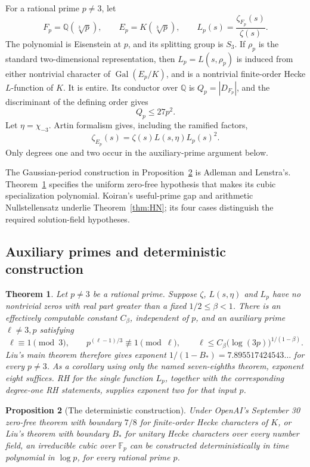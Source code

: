 \documentclass[11pt]{article}
\newtheorem{theorem}{Theorem}[section]
\newtheorem{proposition}[theorem]{Proposition}
\newcommand{\Q}{\mathbb Q}
\newcommand{\F}{\mathbb F}
\begin{document}
For a rational prime $p\ne3$, let
\[
 F_p=\Q(\sqrt[3]p),\qquad E_p=K(\sqrt[3]p),\qquad
 L_p(s)=\frac{\zeta_{F_p}(s)}{\zeta(s)}.
\]
The polynomial is Eisenstein at $p$, and its splitting group is $S_3$.
If $\rho_p$ is the standard two-dimensional representation, then
$L_p=L(s,\rho_p)$ is induced from either nontrivial character of
$\operatorname{Gal}(E_p/K)$, and is a nontrivial finite-order Hecke
$L$-function of $K$. It is entire. Its conductor over $\Q$ is
$Q_p=|D_{F_p}|$, and the discriminant of the defining order gives
\[
 Q_p\le27p^2.                                                     \tag{1.1}
\]
Let $\eta=\chi_{-3}$. Artin formalism gives, including the ramified factors,
\[
 \zeta_{E_p}(s)=\zeta(s)L(s,\eta)L_p(s)^2.                          \tag{1.2}
\]
Only degrees one and two occur in the auxiliary-prime argument below.

The Gaussian-period construction in Proposition~\ref{prop:algorithm}
is Adleman and Lenstra's. Theorem~\ref{thm:aux} specifies the uniform
zero-free hypothesis that makes its cubic specialization polynomial.
Koiran's useful-prime gap and arithmetic Nullstellensatz underlie
Theorem~\ref{thm:HN}; its four cases distinguish the required
solution-field hypotheses.


\subsection*{Auxiliary primes and deterministic construction}
\begin{theorem}\label{thm:aux}
Let $p\ne3$ be a rational prime. Suppose $\zeta$, $L(s,\eta)$ and $L_p$ have no nontrivial zeros
with real part greater than a fixed $1/2\le\beta<1$.
There is an effectively computable constant $C_\beta$, independent
of $p$, and an auxiliary prime $\ell\ne3,p$ satisfying
\[
 \ell\equiv1\pmod3,\qquad
 p^{(\ell-1)/3}\not\equiv1\pmod\ell,\qquad
 \ell\le C_\beta\bigl(\log(3p)\bigr)^{1/(1-\beta)}.                 \tag{1.3}\label{eq:aux-prime-bound}
\]
Liu's main theorem therefore gives exponent
$1/(1-B_*)=7.895517424543\ldots$ for every $p\ne3$.
As a corollary using only the named seven-eighths theorem, exponent
eight suffices. RH for the single function $L_p$, together with
the corresponding degree-one RH statements, supplies exponent two
for that input $p$.
\end{theorem}

\begin{proposition}[The deterministic construction]\label{prop:algorithm}
Under OpenAI's September 30 zero-free theorem with boundary $7/8$
for finite-order Hecke characters of $K$, or Liu's theorem with
boundary $B_*$ for unitary Hecke characters over every number field, an
irreducible cubic over $\F_p$ can be constructed deterministically
in time polynomial in $\log p$, for every rational prime $p$.
\end{proposition}
\end{document}
